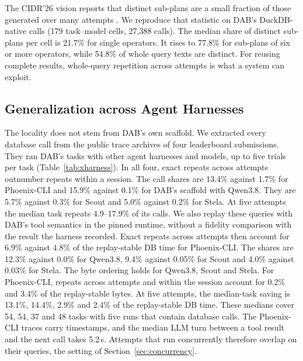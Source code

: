 The CIDR'26 vision reports that distinct sub-plans are a small fraction of those generated over many attempts
\cite{liu2026overlords}. We reproduce that statistic on DAB's DuckDB-native calls (179 task--model cells, 27,388
calls). The median share of distinct sub-plans per cell is 21.7\% for single operators. It rises to 77.8\% for
sub-plans of six or more operators, while 54.8\% of whole query texts are distinct. For reusing complete results, whole-query repetition across attempts is what a system can exploit.

\subsection{Generalization across Agent Harnesses}
\label{sec:xharness}



The locality does not stem from DAB's own scaffold. We extracted every database call from the public trace archives
of four leaderboard submissions. They ran DAB's tasks with other agent harnesses and models, up to five trials per
task (Table~\ref{tab:xharness}). In all four, exact repeats across attempts outnumber repeats within a session. The
call shares are 13.4\% against 1.7\% for Phoenix-CLI and 15.9\% against 0.1\% for DAB's scaffold with Qwen3.8. They
are 5.7\% against 0.3\% for Scout and 5.0\% against 0.2\% for Stela. At five attempts the median task repeats
4.9--17.9\% of its calls. We also replay these queries with DAB's tool semantics in the pinned runtime, without a
fidelity comparison with the result the harness recorded. Exact repeats across attempts then account for 6.9\%
against 4.8\% of the replay-stable DB time for Phoenix-CLI. The shares are 12.3\% against 0.0\% for Qwen3.8, 9.4\%
against 0.05\% for Scout and 4.0\% against 0.03\% for Stela. The byte ordering holds for Qwen3.8, Scout and Stela.
For Phoenix-CLI, repeats across attempts and within the session account for 0.2\% and 3.4\% of the replay-stable
bytes. At five attempts, the median-task saving is 13.1\%, 14.4\%, 2.9\% and 2.4\% of the replay-stable DB time.
These medians cover 54, 54, 37 and 48 tasks with five runs that contain database calls. 
The Phoenix-CLI traces carry timestamps, and the median LLM turn between a tool result and the next call takes
5.2\,s. Attempts that run concurrently therefore overlap on their queries, the setting of
Section~\ref{sec:concurrency}.
